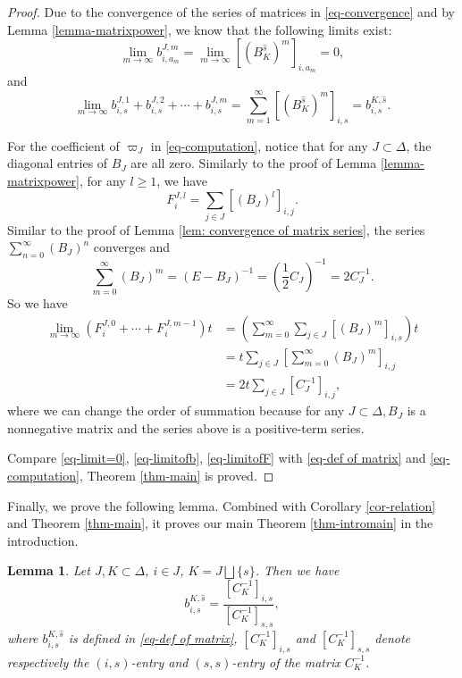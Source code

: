 \documentclass[11pt, letterpaper]{amsart}
\numberwithin{equation}{section}
\newtheorem{lemma}[theorem]{Lemma}
\begin{document}
\begin{proof}
\noindent Due to the convergence of the series of matrices in \eqref{eq-convergence} and by Lemma \ref{lemma-matrixpower}, we know that the following limits exist: 
\begin{equation}
\label{eq-limit=0}
    \lim_{m\to \infty} b_{i,a_m}^{J,m}=\lim_{m\to \infty}[(B_K^{\widehat{s}})^m]_{i,a_m}=0,
\end{equation}
and 
\begin{equation}
\label{eq-limitofb}
\lim_{m\to \infty}b_{i,s}^{J,1}+b_{i,s}^{J,2}+\cdots+b_{i,s}^{J,m}=\sum_{m=1}^{\infty} [(B_K^{\widehat{s}})^m]_{i,s}=b_{i,s}^{K,\widehat{s}}.
\end{equation}

For the coefficient of $\varpi_J$ in \eqref{eq-computation}, notice that for any $J\subset \Delta$, the diagonal entries of $B_J$ are all zero. Similarly to the proof of Lemma \ref{lemma-matrixpower}, for any $l\geq 1$, we have  $$F_i^{J,l}=\sum_{j\in J}[(B_J)^{l}]_{i,j}.$$
Similar to the proof of Lemma \ref{lem: convergence of matrix series}, the series $\sum\limits_{n=0}^\infty(B_J)^n$ converges and 
$$\sum\limits_{m=0}^\infty(B_J)^m=(E-B_J)^{-1}=(\frac{1}{2}C_J)^{-1}=2C_J^{-1}.$$
So we have 
\begin{equation}\label{eq-limitofF}
    \begin{aligned}
\lim_{m\to \infty}(F_i^{J,0}+\cdots+F_i^{J,m-1})t&=\left(\sum_{m=0}^\infty\sum_{j\in J}[(B_J)^{m}]_{i,s}\right) t\\
&=t\sum_{j\in J}\left[\sum_{m=0}^\infty(B_J)^{m}\right]_{i,j}\\
&=2t\sum_{j\in J}[C_J^{-1}]_{i,j},
\end{aligned}
\end{equation}
where we can change the order of summation because for any $J\subset \Delta, B_J$ is a nonnegative matrix and the series above is a positive-term series. 

Compare \eqref{eq-limit=0}, \eqref{eq-limitofb}, \eqref{eq-limitofF} with \eqref{eq-def of matrix} and \eqref{eq-computation}, Theorem \ref{thm-main} is proved.

\end{proof}

Finally, we prove the following lemma. Combined with Corollary \ref{cor-relation} and Theorem \ref{thm-main}, it proves our main Theorem \ref{thm-intromain} in the introduction.

\begin{lemma}\label{lem: manifestly positive formula}
Let $J,K\subset \Delta$, $i\in J$, $K=J \bigsqcup \{s\}$. Then we have 
    \[
        b^{K, \widehat{s}}_{i, s}  = \frac{[C_{K}^{-1}]_{i,s}}{[C_{K}^{-1}]_{s,s}},
    \]
    where $b^{K, \widehat{s}}_{i,s}$ is defined in \eqref{eq-def of matrix},  $[C_{K}^{-1}]_{i,s}$ and $[C_{K}^{-1}]_{s,s}$  denote respectively the $(i, s)$-entry and $(s, s)$-entry of the matrix $C_{K}^{-1}$.
\end{lemma}
\end{document}
